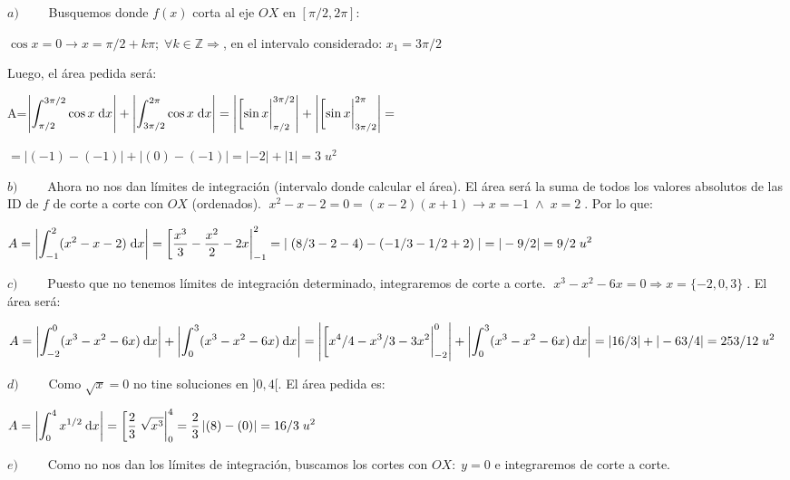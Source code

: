 \begin{proofw}\renewcommand{\qedsymbol}{$\diamond$}


\hspace{5mm} $a) \qquad $ Busquemos donde $f(x)$ corta al eje $OX$ en 	$[\pi/2, 2\pi]$: 

$\cos x = 0 \to x=\pi/2+k\pi; \; \forall k \in \mathbb Z \Rightarrow $, en el intervalo considerado: $x_1=3\pi/2$

Luego, el área pedida será: 

A=$\displaystyle \left| \int_{\pi/2}^{3\pi/2} \cos x \; \dd x \right| + \left| \int_{3\pi/2}^{2\pi} \cos x \; \dd x \right|= 
\left| \eval[\sin x|_{\pi/2}^{3\pi/2} \right| +\left| \eval[\sin x|_{3\pi/2}^{2\pi} \right|=$

$=\displaystyle \left| (-1)-(-1) \right| + \left| (0)-(-1) \right|=|-2|+|1|=3 \; u^2$

\vspace{2mm}$b) \qquad$ Ahora no nos dan límites de integración (intervalo donde calcular el área). El área será la suma de todos los valores absolutos de las ID de $f$ de corte a corte con $OX$ (ordenados).
$\; x^2-x-2=0=(x-2)(x+1) \to x=-1 \; \wedge \; x=2\; $. Por lo que:

$A=\displaystyle \left| \int_{-1}^2 (x^2-x-2)\; \dd x \right|= \eval[\dfrac {x^3}{3}-\dfrac {x^2}{2}-2x|_{-1}^2= \left|\;  (8/3 -2-4)-(-1/3-1/2+2)\;  \right|=|-9/2|= 9/2 \; u^2$

\vspace{2mm}$c) \qquad$ Puesto que no tenemos límites de integración determinado, integraremos de corte a corte.
$\; x^3-x^2-6x=0 \Rightarrow x=\{-2, 0, 3\} \; $. El área será:

$A=\displaystyle \left| \int_{-2}^{0} (x^3-x^2-6x) \: \dd x \right|+ \left| \int_{0}^{3} (x^3-x^2-6x) \: \dd x \right| = \left| \eval[x^4/4-x^3/3-3x^2|_{-2}^0   \right| + \left| \int_{0}^{3} (x^3-x^2-6x) \: \dd x \right|= |16/3|+|-63/4|=253/12\; u^2$

\vspace{2mm}$d) \qquad$ Como $\sqrt{x}=0$ no tine soluciones en $]0,4[$. El área pedida es:

$A=\displaystyle \left| \int_{0}^{4} x^{1/2} \: \dd x \right|=\eval[\frac {2}{3}\; \sqrt{x^3}|_0^4= \frac 2 3 \left| ( 8)-(0)  \right|= 16/3\; u^2$

\vspace{2mm}$e) \qquad$ Como no nos dan los límites de integración, buscamos los cortes con $OX:\; y=0$ e integraremos de corte a corte.


\end{proofw}
